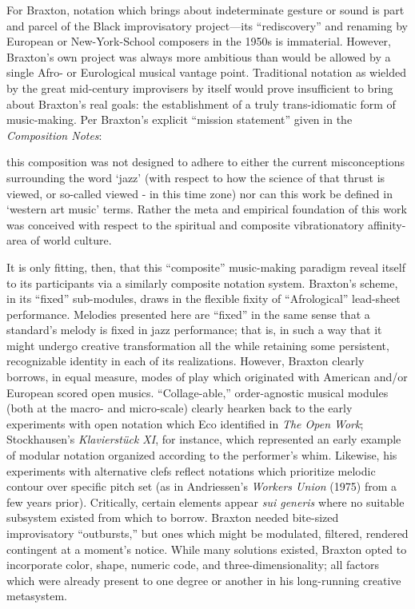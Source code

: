     \noindent For Braxton, notation which brings about indeterminate gesture or sound is part and parcel of the Black improvisatory project---its ``rediscovery'' and renaming by European or New-York-School composers in the 1950s is immaterial. However, Braxton's own project was always more ambitious than would be allowed by a single Afro- or Eurological musical vantage point. Traditional notation as wielded by the great mid-century improvisers by itself would prove insufficient to bring about Braxton's real goals: the establishment of a truly trans-idiomatic form of music-making. Per Braxton's explicit ``mission statement'' given in the \textit{Composition Notes}:

    \begin{smallquote}
        [...] this composition was not designed to adhere to either the current misconceptions surrounding the word `jazz' (with respect to how the science of that thrust is viewed, or so-called viewed - in this time zone) nor can this work be defined in `western art music' terms. Rather the meta and empirical foundation of this work was conceived with respect to the spiritual and composite vibrationatory affinity-area of world culture.\autocite[136-7]{Braxton_1988}
    \end{smallquote}

    It is only fitting, then, that this ``composite'' music-making paradigm reveal itself to its participants via a similarly composite notation system. Braxton's scheme, in its ``fixed'' sub-modules, draws in the flexible fixity of ``Afrological'' lead-sheet performance. Melodies presented here are ``fixed'' in the same sense that a standard's melody is fixed in jazz performance; that is, in such a way that it might undergo creative transformation all the while retaining some persistent, recognizable identity in each of its realizations. However, Braxton clearly borrows, in equal measure, modes of play which originated with American and/or European scored open musics. ``Collage-able,'' order-agnostic musical modules (both at the macro- and micro-scale) clearly hearken back to the early experiments with open notation which Eco identified in \textit{The Open Work}; Stockhausen's \textit{Klavierstück XI}, for instance, which represented an early example of modular notation organized according to the performer's whim.\autocite[1]{Eco_Robey_1989} Likewise, his experiments with alternative clefs reflect notations which prioritize melodic contour over specific pitch set (as in Andriessen's \textit{Workers Union} (1975) from a few years prior). Critically, certain elements appear \textit{sui generis} where no suitable subsystem existed from which to borrow. Braxton needed bite-sized improvisatory ``outbursts,'' but ones which might be modulated, filtered, rendered contingent at a moment's notice. While many solutions existed, Braxton opted to incorporate color, shape, numeric code, and three-dimensionality; all factors which were already present to one degree or another in his long-running creative metasystem.

